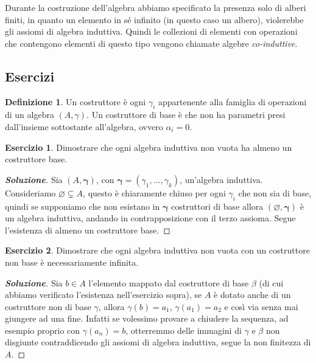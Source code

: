\documentclass{article}
\theoremstyle{definition}
\newtheorem{esercizio}{Esercizio}
\theoremstyle{definition}
\theoremstyle{definition}
\newtheorem{definition}[theorem]{Definizione}
\theoremstyle{remark}
\begin{document}
Durante la costruzione dell'algebra abbiamo specificato la presenza  solo di alberi finiti, in quanto un elemento in sé infinito (in questo caso un albero), violerebbe gli assiomi di algebra induttiva. Quindi le collezioni di elementi con operazioni che contengono elementi di questo tipo
vengono chiamate algebre \textit{co-induttive}.

\subsection{Esercizi}
\begin{definition}
    Un costruttore è  ogni $\gamma_i$ appartenente alla famiglia di operazioni di un algebra $(A,\gamma)$. Un costruttore di base è che non ha parametri presi dall'insieme sottostante all'algebra, ovvero $\alpha_i = 0$.
\end{definition}
\begin{esercizio}
    Dimostrare che ogni algebra induttiva non vuota ha almeno un
    costruttore base.
\end{esercizio}
\begin{proof}[\textbf{Soluzione}]Sia $(A,\boldsymbol{\gamma})$, con $\boldsymbol{\gamma} = (\gamma_1,\dots, \gamma_k)$, un'algebra induttiva.
    Consideriamo $\varnothing \subsetneq A$, questo è chiaramente chiuso per ogni $\gamma_i$ che non sia di base, quindi se supponiamo
    che non esistano  in $\boldsymbol{\gamma}$ costruttori di base allora $(\varnothing,\boldsymbol{\gamma})$ è un algebra induttiva, andando in
    contrapposizione con il terzo assioma. Segue l'esistenza di almeno un costruttore base.
\end{proof}
\begin{esercizio}
    Dimostrare che ogni algebra induttiva non vuota con un
    costruttore non base è necessariamente infinita.
\end{esercizio}
\begin{proof}[\textbf{Soluzione}] Sia $b\in A$  l'elemento mappato dal costruttore di base $\beta$ (di cui abbiamo
    verificato l'esistenza nell'esercizio sopra), se $A$ è dotato anche di un costruttore
    non di base $\gamma$, allora $\gamma(b) = a_1$, $\gamma(a_1) = a_2$ e così via senza mai giungere ad una fine.
    Infatti se volessimo provare a chiudere la sequenza, ad esempio proprio con $\gamma(a_n)=b$, otterremmo delle
    immagini di $\gamma$ e $\beta$ non disgiunte contraddicendo gli assiomi di algebra induttiva, segue la non finitezza di $A$.
\end{proof}
\end{document}
